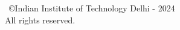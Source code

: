 
\begin{center}

\large

\ \\ \
\vspace{16cm}
\ \\ \
\copyright{Indian Institute of Technology Delhi - 2024}\\
All rights reserved.

\end{center}


